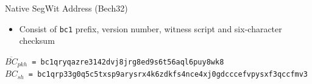 \documentclass[handout]{beamer}
\begin{document}
\begin{frame}{Native SegWit Address (Bech32)}
	\begin{itemize}
		\item Consist of \texttt{bc1} prefix, version number, witness script and six-character checksum	
	\end{itemize}
	
	\vspace{1.5em}
	
	\begin{scriptsize}
		\texttt{$\overline{BC}_{pkh}$ = bc1qryqazre3142dvj8jrg8ed9s6t56aql6puy8wk8}\\
		\texttt{$BC_{sh}$ = bc1qrp33g0q5c5txsp9arysrx4k6zdkfs4nce4xj0gdcccefvpysxf3qccfmv3}
	\end{scriptsize}
\end{frame}
\end{document}
